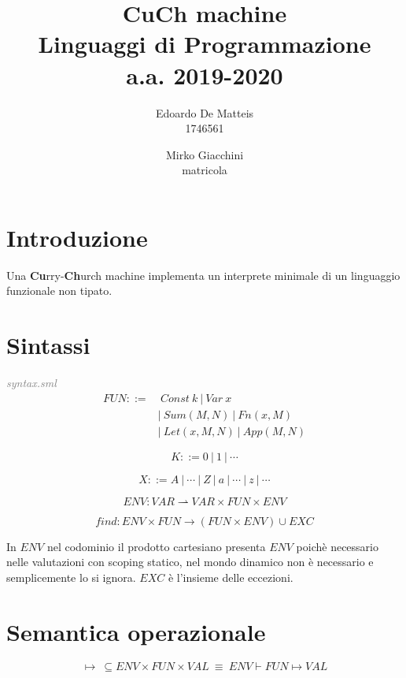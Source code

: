 \documentclass[a4paper]{article}
\title{%
	CuCh machine \\
  	\large Linguaggi di Programmazione \\ 
	a.a. 2019-2020}
\author{Edoardo De Matteis  \\ 1746561 
   \and Mirko Giacchini \\ matricola }
\date{}
\begin{document}
	\maketitle
	\tableofcontents
	
	\section{Introduzione}
	Una \textbf{Cu}rry-\textbf{Ch}urch machine implementa un interprete minimale di un linguaggio funzionale non tipato.   
	\section{Sintassi}
	\textit{\textcolor{gray}{syntax.sml}} \\
	 
	\begin{equation} \label{fun}
	\begin{split}
		FUN ::= & \ Const \ k \ |\ Var \ x \\
			&|\ Sum(M, N) \ |\ Fn(x, M) \\ 
			&|\ Let(x, M, N) \ |\ App(M, N) 
	\end{split}
	\end{equation}

	\begin{equation}
		K ::= 0 \ | \ 1 \ | \ \cdots
	\end{equation}
	
	\begin{equation}
		X ::= A \ | \ \cdots \ | \ Z \ | \ a \ | \ \cdots \ | \ z \ | \ \cdots
	\end{equation}

	\begin{equation} \label{env}
		ENV : VAR \rightharpoonup VAR \times FUN \times ENV
	\end{equation}

	\begin{equation} \label{find}
		find: ENV \times FUN \rightarrow (FUN \times ENV) \cup EXC
	\end{equation}
	
	In $ENV$ nel codominio il prodotto cartesiano presenta  $ENV$ poichè necessario nelle valutazioni con scoping statico, nel mondo dinamico non è necessario e semplicemente lo si ignora. $EXC$ è l'insieme delle eccezioni.

	\section{Semantica operazionale}
	\begin{equation} \label{eval}
		\mapsto \ \subseteq ENV \times FUN \times VAL \ \equiv \ ENV \vdash FUN \mapsto VAL
	\end{equation}
\end{document}

